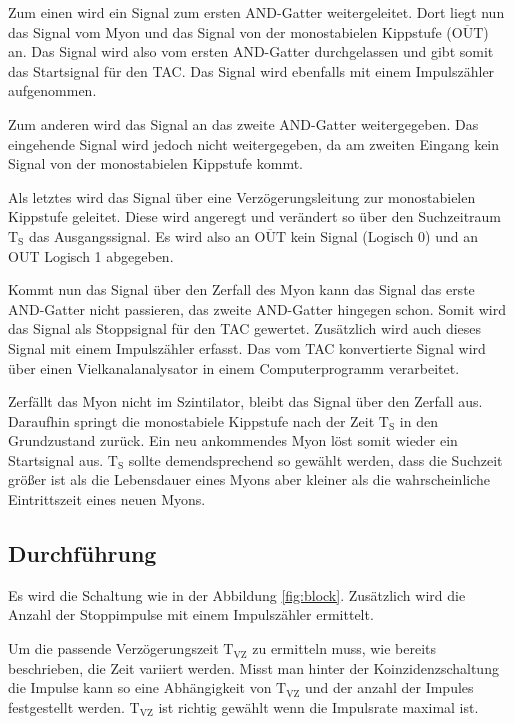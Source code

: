 Zum einen wird ein Signal zum ersten AND-Gatter weitergeleitet.
Dort liegt nun das Signal vom Myon und das Signal von der monostabielen Kippstufe ($\overline{\text{OUT}}$) an.
Das Signal wird also vom ersten AND-Gatter durchgelassen und gibt somit das Startsignal für den TAC.
Das Signal wird ebenfalls mit einem Impulszähler aufgenommen.

Zum anderen wird das Signal an das zweite AND-Gatter weitergegeben.
Das eingehende Signal wird jedoch nicht weitergegeben, da am zweiten Eingang kein Signal von der monostabielen Kippstufe kommt.

Als letztes wird das Signal über eine Verzögerungsleitung zur monostabielen Kippstufe geleitet.
Diese wird angeregt und verändert so über den Suchzeitraum $\text{T}_{\text{S}}$ das Ausgangssignal.
Es wird also an $\overline{\text{OUT}}$ kein Signal (Logisch 0) und an OUT Logisch 1 abgegeben.

Kommt nun das Signal über den Zerfall des Myon kann das Signal das erste AND-Gatter nicht passieren, das zweite AND-Gatter hingegen schon.
Somit wird das Signal als Stoppsignal für den TAC gewertet.
Zusätzlich wird auch dieses Signal mit einem Impulszähler erfasst.
Das vom TAC konvertierte Signal wird über einen Vielkanalanalysator in einem Computerprogramm verarbeitet.

Zerfällt das Myon nicht im Szintilator, bleibt das Signal über den Zerfall aus.
Daraufhin springt die monostabiele Kippstufe nach der Zeit $\text{T}_{\text{S}}$ in den Grundzustand zurück.
Ein neu ankommendes Myon löst somit wieder ein Startsignal aus.
$\text{T}_{\text{S}}$ sollte demendsprechend so gewählt werden, dass die Suchzeit größer ist als die Lebensdauer eines Myons
aber kleiner als die wahrscheinliche Eintrittszeit eines neuen Myons.

\subsection{Durchführung}
Es wird die Schaltung wie in der Abbildung \ref{fig:block}.
Zusätzlich wird die Anzahl der Stoppimpulse mit einem Impulszähler ermittelt.

Um die passende Verzögerungszeit $\text{T}_{\text{VZ}}$ zu ermitteln muss, wie bereits beschrieben, die Zeit variiert werden.
Misst man hinter der Koinzidenzschaltung die Impulse kann so eine Abhängigkeit von $\text{T}_{\text{VZ}}$ und der anzahl der Impules festgestellt werden.
$\text{T}_{\text{VZ}}$ ist richtig gewählt wenn die Impulsrate maximal ist.

